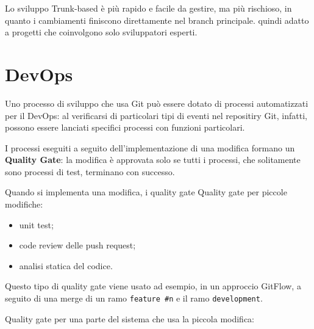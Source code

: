 Lo sviluppo Trunk-based è più rapido e facile da gestire, ma più rischioso, in quanto i cambiamenti finiscono direttamente nel branch principale. \upperAccE quindi adatto a progetti che coinvolgono solo sviluppatori esperti.

\section{DevOps}
Uno processo di sviluppo che usa Git può essere dotato di processi automatizzati per il DevOps: al verificarsi di particolari tipi di eventi nel repositiry Git, infatti, possono essere lanciati specifici processi con funzioni particolari.

I processi eseguiti a seguito dell'implementazione di una modifica formano un \textbf{Quality Gate}: la modifica è approvata solo se tutti i processi, che solitamente sono processi di test, terminano con successo.

Quando si implementa una modifica, i quality gate
Quality gate per piccole modifiche:
\begin{itemize}
    \item unit test;
    \item code review delle push request;
    \item analisi statica del codice.
\end{itemize}
Questo tipo di quality gate viene usato ad esempio, in un approccio GitFlow, a seguito di una merge di un ramo \verb|feature #n| e il ramo \verb|development|.

Quality gate per una parte del sistema che usa la piccola modifica: